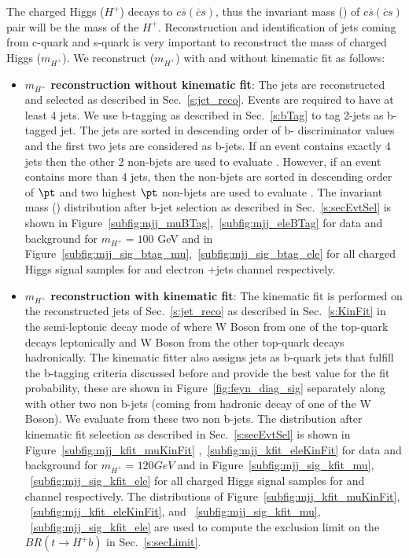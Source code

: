 The charged Higgs ($H^+$) decays to $c\bar{s}(\bar{c}s)$, thus the invariant mass (\mjj) of $c\bar{s}(\bar{c}s)$ pair will be the mass of the $H^+$. Reconstruction and
identification of jets coming from c-quark and s-quark is very important to reconstruct the 
mass of charged Higgs ($m_{H^+}$). We reconstruct ($m_{H^+}$) with and without kinematic fit as follows:
\begin{itemize}
    \item {\bf{$m_{H^+}$ reconstruction without kinematic fit}}: The jets are 
        reconstructed and selected as described in Sec.~\ref{s:jet_reco}. Events are
        required to have at least 4 jets. We use b-tagging as described in Sec.~\ref{s:bTag}
        to tag 2-jets as b-tagged jet. The jets are sorted in descending order of b-
        discriminator
        values and the first two jets are considered as b-jets. If an event contains exactly
        4 jets then the other 2 non-bjets are used to evaluate \mjj. However, if an
        event contains more than 4 jets, then the non-bjets are sorted in descending order of
        $\pt$ and two highest $\pt$ non-bjets are used to evaluate \mjj. The invariant 
        mass
        (\mjj) distribution after b-jet selection as described in Sec.~\ref{s:secEvtSel} is 
        shown in Figure~\ref{subfig:mjj_muBTag},~\ref{subfig:mjj_eleBTag} for data and
        background for $m_{H^+} = 100$ GeV
        and in Figure~\ref{subfig:mjj_sig_btag_mu},~\ref{subfig:mjj_sig_btag_ele} for all 
        charged Higgs
        signal samples for \mujets and electron +jets channel respectively.
    
    \item {\bf{$m_{H^+}$ reconstruction with kinematic fit}}: The kinematic 
        fit is performed on the reconstructed jets of Sec.~\ref{s:jet_reco} as
        described in Sec.~\ref{s:KinFit} in the semi-leptonic decay mode of
        \ttbar where W Boson from one of the top-quark decays leptonically 
        and W Boson from the other top-quark decays hadronically. The kinematic
        fitter also assigns jets as b-quark jets that fulfill the b-tagging
        criteria discussed before and provide the best value for the fit
        probability, these are shown in Figure~\ref{fig:feyn_diag_sig} separately
        along with other two non b-jets (coming from hadronic decay of one of 
        the W Boson). We evaluate \mjj from these two non b-jets. The 
        \mjj distribution after kinematic fit selection as described in
        Sec.~\ref{s:secEvtSel} is shown in  Figure~\ref{subfig:mjj_kfit_muKinFit}
        ,~\ref{subfig:mjj_kfit_eleKinFit} for data and background for 
        $m_{H^+} = 120 GeV$ and in Figure~\ref{subfig:mjj_sig_kfit_mu},
        ~\ref{subfig:mjj_sig_kfit_ele} for all charged Higgs signal samples for
        \mujets and \ejets channel respectively. The \mjj 
        distributions of Figure~\ref{subfig:mjj_kfit_muKinFit},
        ~\ref{subfig:mjj_kfit_eleKinFit}, and ~\ref{subfig:mjj_sig_kfit_mu},
        ~\ref{subfig:mjj_sig_kfit_ele} are used to compute the exclusion limit 
        on the $BR(t\rightarrow H^+ b)$ in Sec.~\ref{s:secLimit}.
    \end{itemize}

